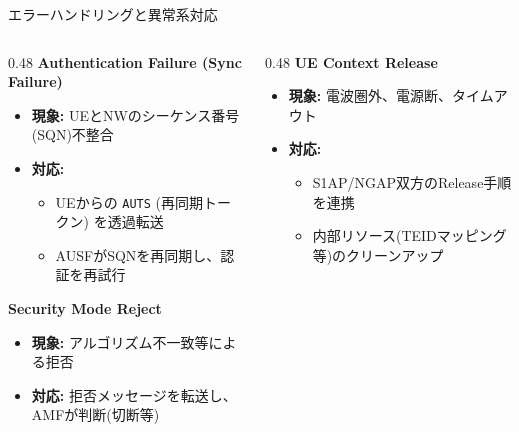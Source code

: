 \documentclass[dvipdfmx,11pt,aspectratio=169]{beamer}
\begin{document}
\begin{frame}{エラーハンドリングと異常系対応}
  \begin{columns}[T]
    \begin{column}{0.48\textwidth}
      \textbf{Authentication Failure (Sync Failure)}
      \begin{itemize}
        \item \textbf{現象:} UEとNWのシーケンス番号(SQN)不整合
        \item \textbf{対応:}
          \begin{itemize}
            \item UEからの \texttt{AUTS} (再同期トークン) を透過転送
            \item AUSFがSQNを再同期し、認証を再試行
          \end{itemize}
      \end{itemize}
      \vspace{0.3cm}
      \textbf{Security Mode Reject}
      \begin{itemize}
        \item \textbf{現象:} アルゴリズム不一致等による拒否
        \item \textbf{対応:} 拒否メッセージを転送し、AMFが判断(切断等)
      \end{itemize}
    \end{column}
    \begin{column}{0.48\textwidth}
      \textbf{UE Context Release}
      \begin{itemize}
        \item \textbf{現象:} 電波圏外、電源断、タイムアウト
        \item \textbf{対応:}
          \begin{itemize}
            \item S1AP/NGAP双方のRelease手順を連携
            \item 内部リソース(TEIDマッピング等)のクリーンアップ
          \end{itemize}
      \end{itemize}
    \end{column}
  \end{columns}
\end{frame}
\end{document}
